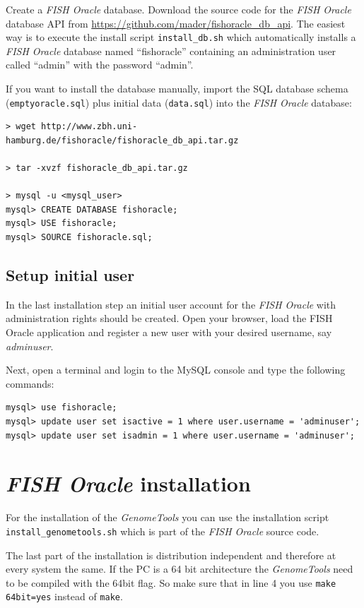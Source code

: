 \documentclass[11pt,final]{article}
\newcommand{\Gt}[0]{\emph{GenomeTools}\xspace}
\newcommand{\FO}[0]{\emph{FISH Oracle}\xspace}
\begin{document}
Create a \FO database. Download the source code for the \FO database API from
\url{https://github.com/mader/fishoracle_db_api}. The easiest way is to
execute the install script \texttt{install\_db.sh} which automatically
installs a \FO database named ``fishoracle'' containing an administration user
called ``admin'' with the password ``admin''.

If you want to install the database manually, import the SQL database schema
(\texttt{emptyoracle.sql}) plus initial data (\texttt{data.sql}) into the
\FO database:

\begin{lstlisting}
> wget http://www.zbh.uni-hamburg.de/fishoracle/fishoracle_db_api.tar.gz

> tar -xvzf fishoracle_db_api.tar.gz

> mysql -u <mysql_user>
mysql> CREATE DATABASE fishoracle;
mysql> USE fishoracle;
mysql> SOURCE fishoracle.sql;
\end{lstlisting}

\subsection{Setup initial user}

In the last installation step an initial user account for the \FO with
administration rights should be created. Open your browser, load the FISH
Oracle application and register a new user with your desired username, say
\emph{adminuser}. 

Next, open a terminal and login to the MySQL console and type the following
commands:

\begin{lstlisting}
mysql> use fishoracle;
mysql> update user set isactive = 1 where user.username = 'adminuser';
mysql> update user set isadmin = 1 where user.username = 'adminuser';
\end{lstlisting}

\section{\FO installation}
\label{fo-install}

For the installation of the \Gt you can use the installation script
\texttt{install\_genometools.sh} which is part of the \FO source code.

The last part of the installation is distribution independent
and therefore at every system the same. If the PC is a 64 bit
architecture the \Gt need to be compiled with the 64bit
flag. So make sure that in line 4 you use \texttt{make 64bit=yes}
instead of \texttt{make}.
\end{document}
